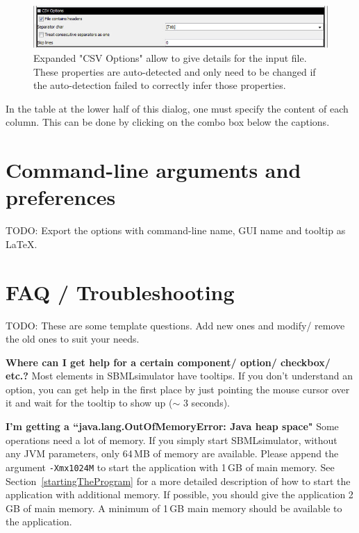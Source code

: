 \begin{figure}[h]
\centerline{\noindent\includegraphics[width=1.0\columnwidth]{figures/expanded_csv_options.jpg}}
\caption{
Expanded "CSV Options" allow to give details for the input file. These properties are auto-detected and only need to be changed if the auto-detection failed to correctly infer those properties.
}\label{fig:csvoptions}
\end{figure}

In the table at the lower half of this dialog, one must specify the content of each column. This can be done by clicking on the combo box below the captions. 

\chapter{Command-line arguments and preferences}

TODO: Export the options with command-line name, GUI name and tooltip as LaTeX.

\chapter{FAQ / Troubleshooting}
\label{ch:faq}

TODO: These are some template questions. Add new ones and modify/ remove the
old ones to suit your needs.

\noindent \textbf{Where can I get help for a certain component/ option/ checkbox/ etc.?}\newline
Most elements in SBMLsimulator have tooltips. If you don't understand an option, you
can get help in the first place by just pointing the mouse cursor over it and
wait for the tooltip to show up ($\sim$ 3 seconds).\newline

\noindent \textbf{I'm getting a ``java.lang.OutOfMemoryError: Java heap space"}\newline
Some operations need a lot of memory. If you simply start SBMLsimulator, without any
JVM parameters, only 64\,MB of memory are available. Please append the argument
\texttt{-Xmx1024M} to start the application with 1\,GB of main memory. See
Section~\vref{startingTheProgram} for a more detailed description of how to
start the application with additional memory. If possible, you should give the
application 2\,GB of main memory. A minimum of 1\,GB main memory should be
available to the application.\newline

